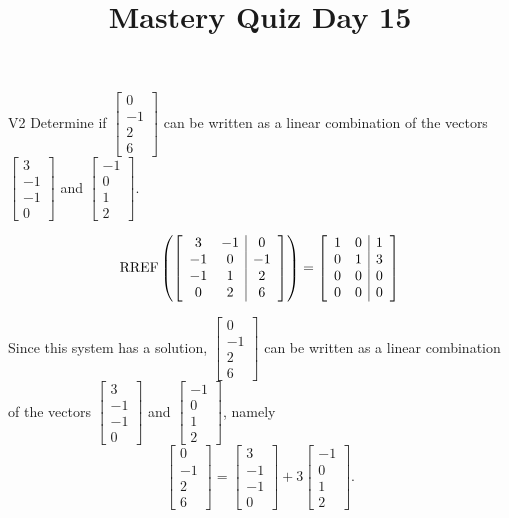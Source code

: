 \documentclass{sbgLAquiz}
\title{Mastery Quiz Day 15 }
\begin{document}
\begin{problem}{V2}
Determine if $\begin{bmatrix}0 \\ -1 \\ 2 \\ 6 \end{bmatrix}$ can be written as a linear combination of the vectors $\begin{bmatrix} 3 \\ -1 \\ -1 \\ 0 \end{bmatrix}$ and $\begin{bmatrix} -1 \\ 0 \\ 1 \\ 2 \end{bmatrix}$.
\end{problem}
\begin{solution}
$$\operatorname{RREF}\left(\left[\begin{array}{cc|c} 3 & -1 & 0 \\ -1 & 0 & -1 \\ -1 & 1 & 2 \\ 0 & 2 & 6\end{array} \right] \right)= \left[ \begin{array}{cc|c} 1 & 0 & 1 \\ 0 & 1 & 3 \\ 0 & 0 & 0 \\ 0 & 0 & 0 \end{array} \right]$$

Since this system has a solution, $\begin{bmatrix}0 \\ -1 \\ 2 \\ 6 \end{bmatrix}$ can be written as a linear combination of the vectors $\begin{bmatrix} 3 \\ -1 \\ -1 \\ 0 \end{bmatrix}$ and $\begin{bmatrix} -1 \\ 0 \\ 1 \\ 2 \end{bmatrix}$, namely
$$\begin{bmatrix}0 \\ -1 \\ 2 \\ 6 \end{bmatrix}=\begin{bmatrix} 3 \\ -1 \\ -1 \\ 0 \end{bmatrix}+3\begin{bmatrix} -1 \\ 0 \\ 1 \\ 2 \end{bmatrix}.$$
\end{solution}
\end{document}
